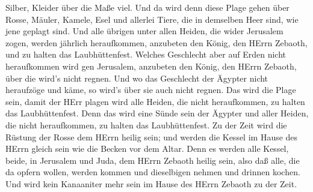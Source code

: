 Silber, Kleider über die Maße viel.  Und da wird denn diese
Plage gehen über Rosse, Mäuler, Kamele, Esel und allerlei Tiere, die in
demselben Heer sind, wie jene geplagt sind.  Und alle
übrigen unter allen Heiden, die wider Jerusalem zogen, werden jährlich
heraufkommen, anzubeten den König, den HErrn Zebaoth, und zu halten das
Laubhüttenfest.  Welches Geschlecht aber auf Erden nicht
heraufkommen wird gen Jerusalem, anzubeten den König, den HErrn Zebaoth,
über die wird's nicht regnen.  Und wo das Geschlecht der
Ägypter nicht heraufzöge und käme, so wird's über sie auch nicht regnen.
Das wird die Plage sein, damit der HErr plagen wird alle Heiden, die
nicht heraufkommen, zu halten das Laubhüttenfest.  Denn das
wird eine Sünde sein der Ägypter und aller Heiden, die nicht
heraufkommen, zu halten das Laubhüttenfest.  Zu der Zeit
wird die Rüstung der Rosse dem HErrn heilig sein; und werden die Kessel
im Hause des HErrn gleich sein wie die Becken vor dem Altar.
 Denn es werden alle Kessel, beide, in Jerusalem und Juda,
dem HErrn Zebaoth heilig sein, also daß alle, die da opfern wollen,
werden kommen und dieselbigen nehmen und drinnen kochen. Und wird kein
Kanaaniter mehr sein im Hause des HErrn Zebaoth zu der Zeit.
